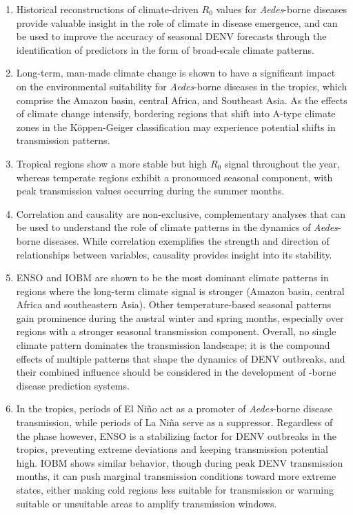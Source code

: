 \documentclass[10pt,twocolumn]{wlscirep}
\begin{document}
\begin{enumerate}
  \item Historical reconstructions of climate-driven $R_0$ values for \textit{Aedes}-borne diseases provide valuable insight in the role of climate in disease emergence, and can be used to improve the accuracy of seasonal DENV forecasts through the identification of predictors in the form of broad-scale climate patterns.
  \item Long-term, man-made climate change is shown to have a significant impact on the environmental suitability for \textit{Aedes}-borne diseases in the tropics, which comprise the Amazon basin, central Africa, and Southeast Asia. As the effects of climate change intensify, bordering regions that shift into A-type climate zones in the Köppen-Geiger classification may experience potential shifts in transmission patterns.
  \item Tropical regions show a more stable but high $R_0$ signal throughout the year, whereas temperate regions exhibit a pronounced seasonal component, with peak transmission values occurring during the summer months.
  \item Correlation and causality are non-exclusive, complementary analyses that can be used to understand the role of climate patterns in the dynamics of \textit{Aedes}-borne diseases. While correlation exemplifies the strength and direction of relationships between variables, causality provides insight into its stability.
  \item ENSO and IOBM are shown to be the most dominant climate patterns in regions where the long-term climate signal is stronger (Amazon basin, central Africa and southeastern Asia). Other temperature-based seasonal patterns gain prominence during the austral winter and spring months, especially over regions with a stronger seasonal transmission component. Overall, no single climate pattern dominates the transmission landscape; it is the compound effects of multiple patterns that shape the dynamics of DENV outbreaks, and their combined influence should be considered in the development of -borne disease prediction systems.
  \item In the tropics, periods of El Niño act as a promoter of \textit{Aedes}-borne disease transmission, while periods of La Niña serve as a suppressor. Regardless of the phase however, ENSO is a stabilizing factor for DENV outbreaks in the tropics, preventing extreme deviations and keeping transmission potential high. IOBM shows similar behavior, though during peak DENV transmission months, it can push marginal transmission conditions toward more extreme states, either making cold regions less suitable for transmission or warming suitable or unsuitable areas to amplify transmission windows.
\end{enumerate}
\end{document}
